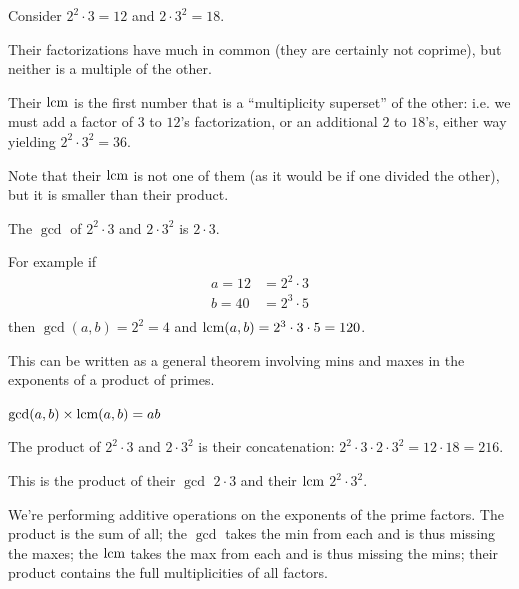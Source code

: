 \begin{example*}
Consider $2^2 \cdot 3 = 12$ and $2\cdot 3^2 = 18$.

Their factorizations have much in common (they are certainly not coprime), but neither is a
multiple of the other.

Their $\text{lcm}$ is the first number that is a ``multiplicity superset​'' of the other: i.e. we must add
a factor of $3$ to $12$'s factorization, or an additional $2$ to $18$'s, either way
yielding $2^2 \cdot 3^2 = 36$.

Note that their $\text{lcm}$ is not one of them (as it would be if one divided the other), but it is
smaller than their product.

The $\gcd$ of $2^2\cdot 3$ and $2\cdot 3^2$ is $2\cdot 3$.
\end{example*}


\begin{example*}
    For example if
  \begin{align*}
    a = 12 &= 2^2 \cdot 3 \\
    b = 40 &= 2^3 \cdot 5 \\
  \end{align*}
  then $\gcd(a, b) = 2^2 = 4$ and $\text{lcm}(a, b) = 2^3 \cdot 3 \cdot 5 = 120$.

  This can be written as a general theorem involving mins and maxes in the exponents of a product
  of primes.
\end{example*}


\begin{theorem*}
  $\gcd(a,b) \times \text{lcm}(a,b) = ab$
\end{theorem*}

\begin{example*}
  The product of  $2^2\cdot 3$ and $2\cdot 3^2$ is their concatenation: $2^2 \cdot 3 \cdot 2 \cdot 3^2 = 12 \cdot 18 = 216$.

  This is the product of their $\gcd$ $2\cdot 3$ and their $\text{lcm}$ $2^2\cdot 3^2$.
\end{example*}


\begin{intuition*}
  We're performing additive operations on the exponents of the prime factors. The product is the
  sum of all; the $\gcd$ takes the min from each and is thus missing the maxes; the $\text{lcm}$ takes
  the max from each and is thus missing the mins; their product contains the full multiplicities of
  all factors.
\end{intuition*}


